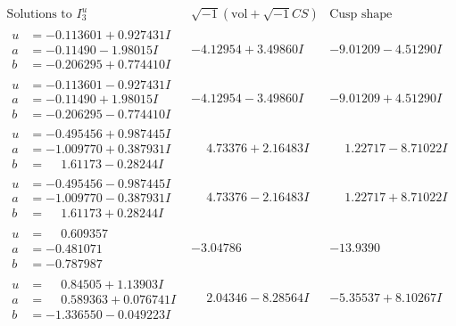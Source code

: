 \documentclass[1p]{elsarticle_modified}
\theoremstyle{definition}
\newcommand{\I}{\sqrt{-1}}
\begin{document}
$$\begin{array}{c|c|c}  
\text{Solutions to }I^u_{3}& \I (\text{vol} + \sqrt{-1}CS) & \text{Cusp shape}\\
 \hline 
\begin{aligned}
u &= -0.113601 + 0.927431 I \\
a &= -0.11490 - 1.98015 I \\
b &= -0.206295 + 0.774410 I\end{aligned}
 & -4.12954 + 3.49860 I & -9.01209 - 4.51290 I \\ \hline\begin{aligned}
u &= -0.113601 - 0.927431 I \\
a &= -0.11490 + 1.98015 I \\
b &= -0.206295 - 0.774410 I\end{aligned}
 & -4.12954 - 3.49860 I & -9.01209 + 4.51290 I \\ \hline\begin{aligned}
u &= -0.495456 + 0.987445 I \\
a &= -1.009770 + 0.387931 I \\
b &= \phantom{-}1.61173 - 0.28244 I\end{aligned}
 & \phantom{-}4.73376 + 2.16483 I & \phantom{-}1.22717 - 8.71022 I \\ \hline\begin{aligned}
u &= -0.495456 - 0.987445 I \\
a &= -1.009770 - 0.387931 I \\
b &= \phantom{-}1.61173 + 0.28244 I\end{aligned}
 & \phantom{-}4.73376 - 2.16483 I & \phantom{-}1.22717 + 8.71022 I \\ \hline\begin{aligned}
u &= \phantom{-}0.609357\phantom{ +0.000000I} \\
a &= -0.481071\phantom{ +0.000000I} \\
b &= -0.787987\phantom{ +0.000000I}\end{aligned}
 & -3.04786\phantom{ +0.000000I} & -13.9390\phantom{ +0.000000I} \\ \hline\begin{aligned}
u &= \phantom{-}0.84505 + 1.13903 I \\
a &= \phantom{-}0.589363 + 0.076741 I \\
b &= -1.336550 - 0.049223 I\end{aligned}
 & \phantom{-}2.04346 - 8.28564 I & -5.35537 + 8.10267 I \\ \hline\begin{aligned}

\end{aligned}
\end{array}$$
\end{document}
